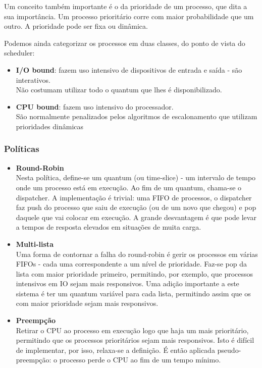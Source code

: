 \documentclass[11pt]{article}
\begin{document}
Um conceito também importante é o da prioridade de um processo, que dita a sua importância. Um processo prioritário corre com maior probabilidade que um outro. A prioridade pode ser fixa ou dinâmica.

Podemos ainda categorizar os processos em duas classes, do ponto de vista do scheduler:
\begin{itemize}
    \item \textbf{I/O bound}: fazem uso intensivo de dispositivos de entrada e saída - são interativos. \\[4pt]
          Não costumam utilizar todo o quantum que lhes é disponibilizado.
    \item \textbf{CPU bound}: fazem uso intensivo do processador. \\[4pt]
          São normalmente penalizados pelos algoritmos de escalonamento que utilizam prioridades dinâmicas
\end{itemize}

\subsubsection*{Políticas}

\begin{itemize}
    \item \textbf{Round-Robin} \\[4pt]
          Nesta política, define-se um quantum (ou time-slice) - um intervalo de tempo onde um processo está em execução. Ao fim de um quantum, chama-se o dispatcher. A implementação é trivial: uma FIFO de processos, o dispatcher faz push do processo que saiu de execução (ou de um novo que chegou) e pop daquele que vai colocar em execução. A grande desvantagem é que pode levar a tempos de resposta elevados em situações de muita carga.
    \item \textbf{Multi-lista} \\[4pt]
          Uma forma de contornar a falha do round-robin é gerir os processos em várias FIFOs - cada uma correspondente a um nível de prioridade. Faz-se pop da lista com maior prioridade primeiro, permitindo, por exemplo, que processos intensivos em IO sejam mais responsivos. Uma adição importante a este sistema é ter um quantum variável para cada lista, permitindo assim que os com maior prioridade sejam mais responsivos.
    \item \textbf{Preempção} \\[4pt]
          Retirar o CPU ao processo em execução logo que haja um mais prioritário, permitindo que os processos prioritários sejam mais responsivos. Isto é difícil de implementar, por isso, relaxa-se a definição. É então aplicada pseudo-preempção: o processo perde o CPU ao fim de um tempo
          mínimo.
\end{itemize}
\end{document}

